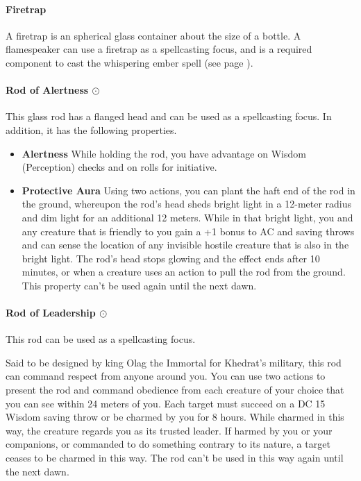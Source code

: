     \paragraph{Firetrap}
        A firetrap is an spherical glass container about the size of a bottle.
        A flamespeaker can use a firetrap as a spellcasting focus, and is a required component to cast the whispering ember spell (see page \pageref{spell::whisperingember}).
    \paragraph{Rod of Alertness $\odot$}
        This glass rod has a flanged head and can be used as a spellcasting focus.
        In addition, it has the following properties.
        \begin{itemize}
            \item \textbf{Alertness}
            While holding the rod, you have advantage on Wisdom (Perception) checks and on rolls for initiative.
            \item \textbf{Protective Aura}
            Using two actions, you can plant the haft end of the rod in the ground, whereupon the rod's head sheds bright light in a 12-meter radius and dim light for an additional 12 meters.
            While in that bright light, you and any creature that is friendly to you gain a +1 bonus to AC and saving throws and can sense the location of any invisible hostile creature that is also in the bright light.
            The rod's head stops glowing and the effect ends after 10 minutes, or when a creature uses an action to pull the rod from the ground.
            This property can't be used again until the next dawn.
        \end{itemize}
    \paragraph{Rod of Leadership $\odot$}
        This rod can be used as a spellcasting focus.

        Said to be designed by king Olag the Immortal for Khedrat's military, this rod can command respect from anyone around you.
        You can use two actions to present the rod and command obedience from each creature of your choice that you can see within 24 meters of you.
        Each target must succeed on a DC 15 Wisdom saving throw or be charmed by you for 8 hours.
        While charmed in this way, the creature regards you as its trusted leader.
        If harmed by you or your companions, or commanded to do something contrary to its nature, a target ceases to be charmed in this way.
        The rod can't be used in this way again until the next dawn.
